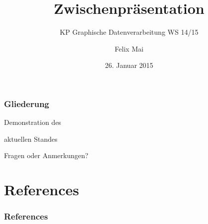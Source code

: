 \documentclass[
	ddcfooter,
	german,
]{tudbeamer}
\title{Zwischenpräsentation}
\subtitle{KP Graphische Datenverarbeitung WS 14/15}
\author{Felix Mai}
\date{26. Januar 2015}
\begin{document}
\maketitle

\begin{frame}[t]
	\frametitle*{Gliederung}
	\tableofcontents
\end{frame}







\begin{frame}[t]
	\vspace*{2.5cm}
	\centerline{\huge{Demonstration des}}
	\centerline{\huge{aktuellen Standes}}
\end{frame}


\begin{frame}[t]
	\vspace*{2.5cm}
	\centerline{\huge{Fragen oder Anmerkungen?}}
\end{frame}


\section*{References}

\begin{frame}[t]
	\frametitle*{References}
	\renewcommand*{\bibfont}{\tiny}
	\nocite{*}
	\printbibliography[title=References]
\end{frame}
\end{document}
